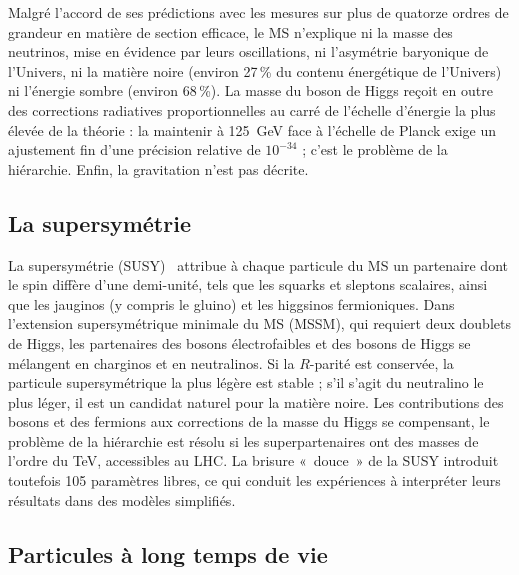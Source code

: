 Malgré l'accord de ses prédictions avec les mesures sur plus de quatorze ordres de grandeur en matière de section efficace, le MS n'explique ni la masse des neutrinos, mise en évidence par leurs oscillations, ni l'asymétrie baryonique de l'Univers, ni la matière noire (environ 27\,\% du contenu énergétique de l'Univers) ni l'énergie sombre (environ 68\,\%). La masse du boson de Higgs reçoit en outre des corrections radiatives proportionnelles au carré de l'échelle d'énergie la plus élevée de la théorie : la maintenir à 125~GeV face à l'échelle de Planck exige un ajustement fin d'une précision relative de $10^{-34}$ ; c'est le problème de la hiérarchie. Enfin, la gravitation n'est pas décrite.

\subsection{La supersymétrie}

La supersymétrie (SUSY)~\cite{ELLIS1984453,Ellis:591472} attribue à chaque particule du MS un partenaire dont le spin diffère d'une demi-unité, tels que les squarks et sleptons scalaires, ainsi que les jauginos (y compris le gluino) et les higgsinos fermioniques. Dans l'extension supersymétrique minimale du MS (MSSM), qui requiert deux doublets de Higgs, les partenaires des bosons électrofaibles et des bosons de Higgs se mélangent en charginos et en neutralinos. Si la $R$-parité est conservée, la particule supersymétrique la plus légère est stable ; s'il s'agit du neutralino le plus léger, il est un candidat naturel pour la matière noire. Les contributions des bosons et des fermions aux corrections de la masse du Higgs se compensant, le problème de la hiérarchie est résolu si les superpartenaires ont des masses de l'ordre du TeV, accessibles au LHC. La brisure «~douce~» de la SUSY introduit toutefois 105 paramètres libres, ce qui conduit les expériences à interpréter leurs résultats dans des modèles simplifiés.

\subsection{Particules à long temps de vie}

